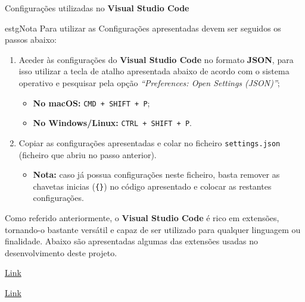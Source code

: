 

\begin{longlisting}
	\inputminted{json}{code/vscode-settings.json}
	\caption{Configurações utilizadas no \textbf{Visual Studio Code}}
\end{longlisting}

\begin{mybox}{estg}{Nota}
	Para utilizar as Configurações apresentadas devem ser seguidos os passos abaixo:

	\begin{enumerate}
		\item Aceder às configurações do \textbf{Visual Studio Code} no formato \textbf{JSON}, para isso utilizar a tecla de atalho apresentada abaixo de acordo com o sistema operativo e pesquisar pela opção \textit{``Preferences: Open Settings (JSON)''};
		\begin{itemize}
			\item \textbf{No macOS:} \texttt{CMD + SHIFT + P};
			\item \textbf{No Windows/Linux:} \texttt{CTRL + SHIFT + P}.
		\end{itemize}
		\item Copiar as configurações apresentadas e colar no ficheiro \texttt{settings.json} (ficheiro que abriu no passo anterior).
		\begin{itemize}
			\item \textbf{Nota:} caso já possua configurações neste ficheiro, basta remover as chavetas inicias (\verb|{}|) no código apresentado e colocar as restantes configurações.
		\end{itemize}
	\end{enumerate}
\end{mybox}


Como referido anteriormente, o \textbf{Visual Studio Code} é rico em extensões, tornando-o bastante versátil e capaz de ser utilizado para qualquer linguagem ou finalidade. Abaixo são apresentadas algumas das extensões usadas no desenvolvimento deste projeto.

\begin{minipage}[t]{0.5\textwidth}
	\centering

	\href{https://marketplace.visualstudio.com/items?itemName=dsznajder.es7-react-js-snippets}{Link}
\end{minipage}
\begin{minipage}[t]{0.5\textwidth}
	\centering

	\href{https://marketplace.visualstudio.com/items?itemName=steoates.autoimport}{Link}
\end{minipage}

